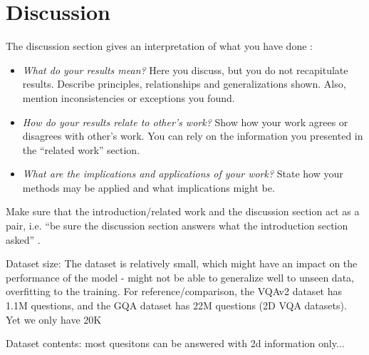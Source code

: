 %
\newpage
\chapter{Discussion}
The discussion section gives an interpretation of what you have done \cite{day2006wap}:

\begin{itemize}
 \item \textit{What do your results mean?} Here you discuss, but you do not recapitulate results. Describe principles, relationships and generalizations shown. Also, mention inconsistencies or exceptions you found.
 \item \textit{How do your results relate to other's work?} Show how your work agrees or disagrees with other's work. You can rely on the information you presented in the ``related work'' section.
 \item \textit{What are the implications and applications of your work?} State how your methods may be applied and what implications might be. 
\end{itemize}

\noindent Make sure that the introduction/related work and the discussion section act as a pair, i.e. ``be sure the discussion section answers what the introduction section asked'' \cite{day2006wap}.

Dataset size: The dataset is relatively small, which might have an impact on the performance of the model - might not be able to generalize well to unseen data, overfitting to the training. 
For reference/comparison, the VQAv2 dataset has 1.1M questions, and the GQA dataset has 22M questions (2D VQA datasets). Yet we only have 20K

Dataset contents: most quesitons can be answered with 2d information only...